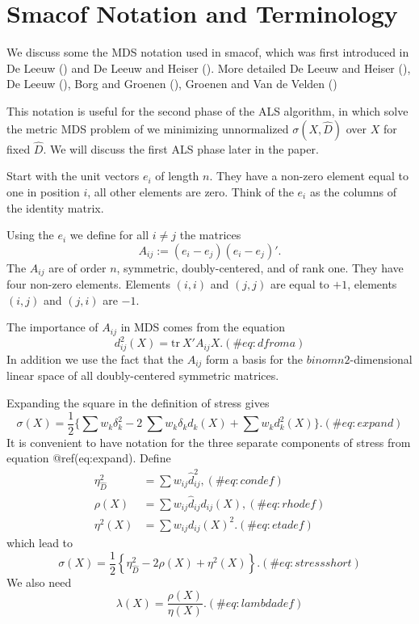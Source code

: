 \documentclass[
  12pt,
  letterpaper,
  DIV=11,
  numbers=noendperiod]{scrartcl}
\begin{document}
\section{Smacof Notation and
Terminology}\label{smacof-notation-and-terminology}

We discuss some the MDS notation used in smacof, which was first
introduced in De Leeuw () and De Leeuw
and Heiser (). More detailed De
Leeuw and Heiser (), De Leeuw
(), Borg and Groenen
(), Groenen and Van de Velden
()

This notation is useful for the second phase of the ALS algorithm, in
which solve the metric MDS problem of we minimizing unnormalized
\(\sigma(X,\hat D)\) over \(X\) for fixed \(\hat D\). We will discuss
the first ALS phase later in the paper.

Start with the unit vectors \(e_i\) of length \(n\). They have a
non-zero element equal to one in position \(i\), all other elements are
zero. Think of the \(e_i\) as the columns of the identity matrix.

Using the \(e_i\) we define for all \(i\not= j\) the matrices
\begin{equation}
A_{ij}:=(e_i-e_j)(e_i-e_j)'.
\end{equation} The \(A_{ij}\) are of order \(n\), symmetric,
doubly-centered, and of rank one. They have four non-zero elements.
Elements \((i,i)\) and \((j,j)\) are equal to \(+1\), elements \((i,j)\)
and \((j,i)\) are \(-1\).

The importance of \(A_{ij}\) in MDS comes from the equation
\begin{equation}
d_{ij}^2(X)=\text{tr}\ X'A_{ij}X.
(\#eq:dfroma)
\end{equation} In addition we use the fact that the \(A_{ij}\) form a
basis for the \(binom{n}{2}\)-dimensional linear space of all
doubly-centered symmetric matrices.

Expanding the square in the definition of stress gives \begin{equation}
\sigma(X)=\frac12\{\sum   w_k\delta_k^2-2\ \sum   w_k\delta_kd_k(X)+\sum   w_kd_k^2(X)\}.
(\#eq:expand)
\end{equation} It is convenient to have notation for the three separate
components of stress from equation @ref(eq:expand). Define \begin{align}
\eta_{\hat D}^2&=\sum   w_{ij}\hat d_{ij}^2,(\#eq:condef)\\
\rho(X)&=\sum   w_{ij}\hat d_{ij}d_{ij}(X),(\#eq:rhodef)\\
\eta^2(X)&=\sum   w_{ij}d_{ij}(X)^2.(\#eq:etadef)
\end{align} which lead to \begin{equation}
\sigma(X)=\frac12\left\{\eta_{\hat D}^2-2\rho(X)+\eta^2(X)\right\}.
(\#eq:stressshort)
\end{equation} We also need \begin{equation}
\lambda(X)=\frac{\rho(X)}{\eta(X)}.
(\#eq:lambdadef)
\end{equation}
\end{document}
